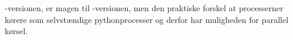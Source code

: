 -versionen, er magen til -versionen, men den praktiske forskel at processerner kørere som selvstændige pythonprocesser og derfor har muligheden for parallel kørsel. 



